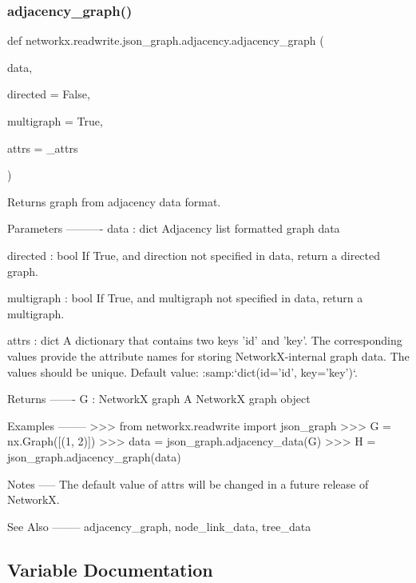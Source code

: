 \subsubsection{\texorpdfstring{adjacency\+\_\+graph()}{adjacency\_graph()}}
{\footnotesize\ttfamily def networkx.\+readwrite.\+json\+\_\+graph.\+adjacency.\+adjacency\+\_\+graph (\begin{DoxyParamCaption}\item[{}]{data,  }\item[{}]{directed = {\ttfamily False},  }\item[{}]{multigraph = {\ttfamily True},  }\item[{}]{attrs = {\ttfamily \+\_\+attrs} }\end{DoxyParamCaption})}

\begin{DoxyVerb}Returns graph from adjacency data format.

Parameters
----------
data : dict
    Adjacency list formatted graph data

directed : bool
    If True, and direction not specified in data, return a directed graph.

multigraph : bool
    If True, and multigraph not specified in data, return a multigraph.

attrs : dict
    A dictionary that contains two keys 'id' and 'key'. The corresponding
    values provide the attribute names for storing NetworkX-internal graph
    data. The values should be unique. Default value:
    :samp:`dict(id='id', key='key')`.

Returns
-------
G : NetworkX graph
   A NetworkX graph object

Examples
--------
>>> from networkx.readwrite import json_graph
>>> G = nx.Graph([(1, 2)])
>>> data = json_graph.adjacency_data(G)
>>> H = json_graph.adjacency_graph(data)

Notes
-----
The default value of attrs will be changed in a future release of NetworkX.

See Also
--------
adjacency_graph, node_link_data, tree_data
\end{DoxyVerb}
 

\subsection{Variable Documentation}
\mbox{\label{namespacenetworkx_1_1readwrite_1_1json__graph_1_1adjacency_a090f610144c26135556629351409fe09}} 
